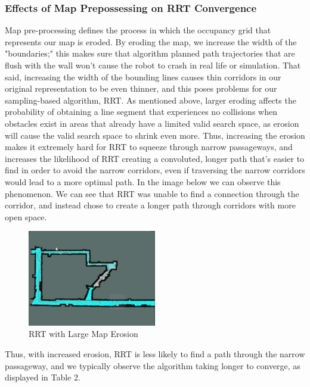 \documentclass{article}
\begin{document}
\subsubsection{Effects of Map Prepossessing on RRT Convergence} 
Map pre-processing defines the process in which the occupancy grid that represents our map is eroded. By eroding the map, we increase the width of the "boundaries;" this makes sure that algorithm planned path trajectories that are flush with the wall won't cause the robot to crash in real life or simulation. That said, increasing the width of the bounding lines causes thin corridors in our original representation to be even thinner, and this poses problems for our sampling-based algorithm, RRT. As mentioned above, larger eroding affects the probability of obtaining a line segment that experiences no collisions when obstacles exist in areas that already have a limited valid search space, as erosion will cause the valid search space to shrink even more. Thus, increasing the erosion makes it extremely hard for RRT to squeeze through narrow passageways, and increases the likelihood of RRT creating a convoluted, longer path that's easier to find in order to avoid the narrow corridors, even if traversing the narrow corridors would lead to a more optimal path. In the image below we can observe this phenomenon. We can see that RRT was unable to find a connection through the corridor, and instead chose to create a longer path through corridors with more open space.

\begin{figure}[h]
\begin{center}
\includegraphics[width=0.5\textwidth]{convoluted_rrt.png}
\caption{RRT with Large Map Erosion}
\end{center}
\end{figure}

Thus, with increased erosion, RRT is less likely to find a path through the narrow passageway, and we typically observe the algorithm taking longer to converge, as displayed in Table 2.
\end{document}

